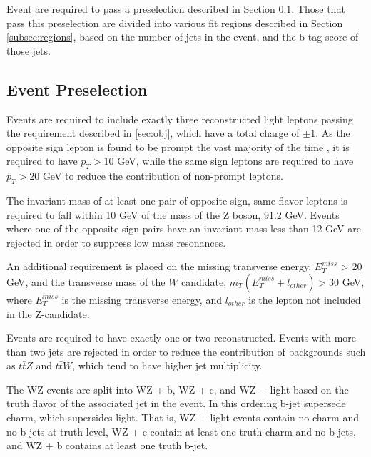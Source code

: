 
Event are required to pass a preselection described in Section \ref{subsec:presel}. Those that pass this preselection are divided into various fit regions described in Section \ref{subsec:regions}, based on the number of jets in the event, and the b-tag score of those jets.

\subsection{Event Preselection}
\label{subsec:presel}

Events are required to include exactly three reconstructed light leptons passing the requirement described in \ref{sec:obj}, which have a total charge of $\pm$1. As the opposite sign lepton is found to be prompt the vast majority of the time \cite{ttH_paper}, it is required to have $p_T > 10$ GeV, while the same sign leptons are required to have $p_T > 20$ GeV to reduce the contribution of non-prompt leptons.

The invariant mass of at least one pair of opposite sign, same flavor leptons is required to fall within 10 GeV of the mass of the Z boson, 91.2 GeV. Events where one of the opposite sign pairs have an invariant mass less than 12 GeV are rejected in order to suppress low mass resonances. %

An additional requirement is placed on the missing transverse energy, $E^{miss}_T$ > 20 GeV, and the transverse mass of the $W$ candidate, $m_T(E^{miss}_T + l_{other}) > 30$ GeV, where $E^{miss}_T$ is the missing transverse energy, and $l_{other}$ is the lepton not included in the Z-candidate. 

Events are required to have exactly one or two reconstructed. Events with more than two jets are rejected in order to reduce the contribution of backgrounds such as $t\bar{t}Z$ and $t\bar{t}W$, which tend to have higher jet multiplicity. 

The WZ events are split into WZ + b, WZ + c, and WZ + light based on the truth flavor of the associated jet in the event. In this ordering b-jet supersede charm, which supersides light. That is, WZ + light events contain no charm and no b jets at truth level, WZ + c contain at least one truth charm and no b-jets, and WZ + b contains at least one truth b-jet. 

